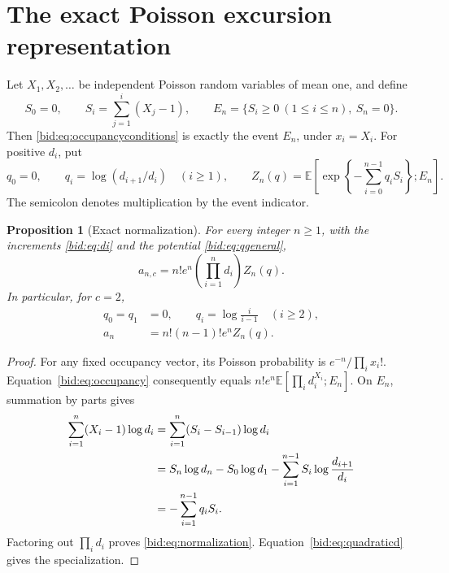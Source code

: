 \documentclass[11pt,letterpaper]{article}
\numberwithin{equation}{section}
\newtheorem{proposition}[theorem]{Proposition}
\theoremstyle{remark}\newtheorem{remark}[theorem]{Remark}
\newcommand{\EE}{\mathbb E}
\begin{document}
\section{The exact Poisson excursion representation}\label{bid:sec:poisson}
Let $X_1,X_2,\ldots$ be independent Poisson random variables of mean one,
and define
\begin{equation}\label{bid:eq:walk}
 S_0=0,\qquad S_i=\sum_{j=1}^i(X_j-1),\qquad
 E_n=\{S_i\geq0\ (1\leq i\leq n),\ S_n=0\}.
\end{equation}
Then \eqref{bid:eq:occupancyconditions} is exactly the event $E_n$, under
$x_i=X_i$. For positive $d_i$, put
\begin{equation}\label{bid:eq:qgeneral}
 q_0=0,\qquad q_i=\log(d_{i+1}/d_i)\quad(i\geq1),\qquad
 Z_n(q)=\EE\left[\exp\left\{-\sum_{i=0}^{n-1}q_iS_i\right\};E_n\right].
\end{equation}
The semicolon denotes multiplication by the event indicator.

\begin{proposition}[Exact normalization]\label{bid:prop:normalization}
For every integer $n\geq1$, with the increments \eqref{bid:eq:di} and the
potential \eqref{bid:eq:qgeneral},
\begin{equation}\label{bid:eq:normalization}
 a_{n,c}=n!e^n\left(\prod_{i=1}^n d_i\right)Z_n(q).
\end{equation}
In particular, for $c=2$,
\begin{align}
 q_0=q_1&=0,\qquad q_i=\log\frac{i}{i-1}\quad(i\geq2),\label{bid:eq:q2}\\
 a_n&=n!(n-1)!e^nZ_n(q).\label{bid:eq:normalization2}
\end{align}
\end{proposition}
\begin{proof}
For any fixed occupancy vector, its Poisson probability is
$e^{-n}/\prod_i x_i!$. Equation~\eqref{bid:eq:occupancy} consequently equals
$n!e^n\EE[\prod_i d_i^{X_i};E_n]$. On $E_n$, summation by parts gives
\begin{align}
 \sum_{i=1}^n(X_i-1)\log d_i
 &=\sum_{i=1}^n(S_i-S_{i-1})\log d_i\notag\\
 &=S_n\log d_n-S_0\log d_1
   -\sum_{i=1}^{n-1}S_i\log\frac{d_{i+1}}{d_i}\notag\\
 &=-\sum_{i=1}^{n-1}q_iS_i.\label{bid:eq:summationparts}
\end{align}
Factoring out $\prod_i d_i$ proves \eqref{bid:eq:normalization}.
Equation~\eqref{bid:eq:quadraticd} gives the specialization.
\end{proof}
\end{document}
